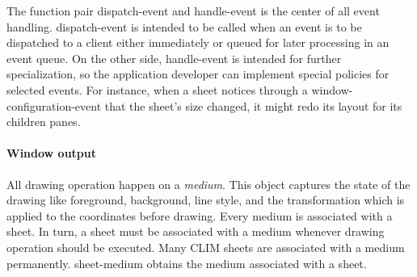 \documentclass[twocolumn,a4paper]{article}
\newcommand {\concept} [1] {{\sl #1}\index{#1}}
\newcommand {\code}[1]{{\sffamily #1}}
\newcommand {\CLIM}{{\small CLIM}}
\begin{document}
The function pair \code{dispatch-event} and \code{handle-event} is the
center of all event handling. \code{dispatch-event} is intended to be
called when an event is to be dispatched to a client either
immediately or queued for later processing in an event queue. On the
other side, \code{handle-event} is intended for further
specialization, so the application developer can implement special
policies for selected events. For instance, when a sheet notices
through a \code{window-configuration-event} that the sheet's size
changed, it might redo its layout for its children panes.



\paragraph*{Window output}

All drawing operation happen on a \concept{medium}. This object
captures the state of the drawing like foreground, background, line
style, and the transformation which is applied to the coordinates
before drawing. Every medium is associated with a sheet. In turn, a
sheet must be associated with a medium whenever drawing operation
should be executed. Many \CLIM{} sheets are associated with a medium
permanently. \code{sheet-medium} obtains the medium associated with a
sheet.
\end{document}
